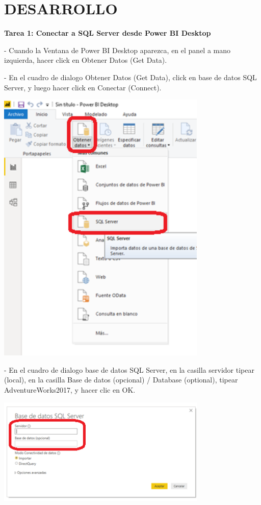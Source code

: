 \section{DESARROLLO}
\textbf{Tarea 1: Conectar a SQL Server desde Power BI Desktop} \\
\item{- Cuando la Ventana de Power BI Desktop aparezca, en el panel a mano izquierda, hacer click en Obtener
Datos (Get Data).}
\item{- En el cuadro de dialogo Obtener Datos (Get Data), click en base de datos SQL Server, y luego hacer click en
Conectar (Connect).}
\begin{center}
\includegraphics[width=10cm]{./Imagenes/image001}
\end{center}

\item{- En el cuadro de dialogo base de datos SQL Server, en la casilla servidor tipear (local), en la casilla Base de
datos (opcional) / Database (optional), tipear AdventureWorks2017, y hacer clic en OK. }
\begin{center}
\includegraphics[width=10cm]{./Imagenes/image002}
\end{center}

